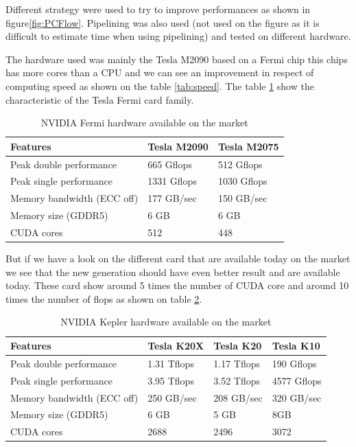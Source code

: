 Different strategy were used to try to improve performances as shown in figure\ref{fig:PCFlow}. Pipelining was also used (not used on the figure as it is difficult to estimate time when using pipelining) and tested on different hardware.

The hardware used was mainly the Tesla M2090 based on a Fermi chip this chips has more cores than a CPU and we can see an improvement in respect of computing speed as shown on the table \ref{tab:speed}. The table \ref{tab:fermi} show the characteristic of the Tesla Fermi card family.

\begin{table}[H]
	\caption{NVIDIA Fermi hardware available on the market}
	\label{tab:fermi}
	\centering
	\begin{tabular}{|l|l|l|}
		\hline
			Features & Tesla M2090 & Tesla M2075 \\
		\hline
		\hline
			Peak double performance & 665 Gflops  & 512 Gflops \\
		\hline
			Peak single performance & 1331 Gflops & 1030 Gflops \\
		\hline
			Memory bandwidth (ECC off) & 177 GB/sec & 150 GB/sec \\
		\hline
			Memory size (GDDR5) & 6 GB & 6 GB \\
		\hline
			CUDA cores & 512 & 448 \\
		\hline
	\end{tabular}
\end{table}

But if we have a look on the different card that are available today on the market we see that the new generation should have even better result and are available today. These card show around 5 times the number of \gls{CUDA} core and around 10 times the number of \gls{flops} as shown on table \ref{tab:kepler}.

\begin{table}[H]
	\centering
	\caption{NVIDIA Kepler hardware available on the market}
	\label{tab:kepler}
	\begin{tabular}{|l|l|l|l|}
		\hline
			Features & Tesla K20X & Tesla K20 & Tesla K10 \\
		\hline
		\hline
			Peak double performance & 1.31 Tflops & 1.17 Tflops & 190 Gflops \\
		\hline
			Peak single performance & 3.95 Tflops & 3.52 Tflops & 4577 Gflops \\
		\hline
			Memory bandwidth (ECC off) & 250 GB/sec & 208 GB/sec & 320 GB/sec \\
		\hline
			Memory size (GDDR5) & 6 GB & 5 GB & 8GB \\
		\hline
			CUDA cores & 2688 & 2496 & 3072 \\
		\hline
	\end{tabular}
\end{table}


